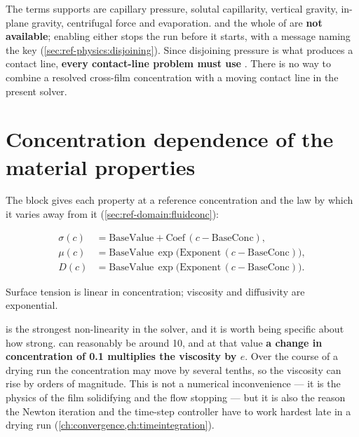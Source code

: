 \begin{warn}
  The terms  supports are capillary pressure, solutal capillarity,
  vertical gravity, in-plane gravity, centrifugal force and evaporation.
   and the whole of  are
  \textbf{not available}; enabling either stops the run before it starts,
  with a message naming the key (\cref{sec:ref-physics:disjoining}). Since disjoining pressure is what
  produces a contact line, \textbf{every contact-line problem must use}
  . There is no way to combine a resolved cross-film concentration
  with a moving contact line in the present solver.
\end{warn}

\section{Concentration dependence of the material properties}
\label{sec:conc:properties}

The  block gives each property at a reference concentration
 and the law by which it varies away from it
(\cref{sec:ref-domain:fluidconc}):

\begin{align}
  \sigma(c) &= \mathrm{BaseValue}
    + \mathrm{Coef}\,(c - \mathrm{BaseConc}),
    \label{eq:prop-sigma}\\
  \mu(c) &= \mathrm{BaseValue}\,
    \exp\bigl(\mathrm{Exponent}\,(c - \mathrm{BaseConc})\bigr),
    \label{eq:prop-mu}\\
  D(c) &= \mathrm{BaseValue}\,
    \exp\bigl(\mathrm{Exponent}\,(c - \mathrm{BaseConc})\bigr).
    \label{eq:prop-diff}
\end{align}

Surface tension is linear in concentration; viscosity and diffusivity are
exponential.

 is the strongest non-linearity in the solver, and it is worth
being specific about how strong.  can reasonably
be around 10, and at that value \textbf{a change in concentration of 0.1
multiplies the viscosity by $e$}. Over the course of a drying run the
concentration may move by several tenths, so the viscosity can rise by orders
of magnitude. This is not a numerical inconvenience --- it is the physics of
the film solidifying and the flow stopping --- but it is also the reason the
Newton iteration and the time-step controller have to work hardest late in a
drying run (\cref{ch:convergence,ch:timeintegration}).

